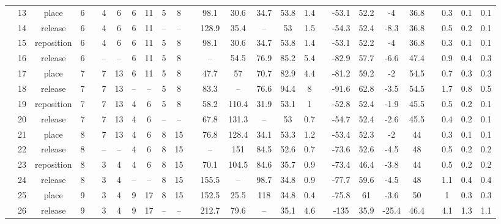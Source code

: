 \begin{landscape}
\begin{scriptsize}
\begin{longtable}{c cccr ccccccr cccccr ccccr ccc}
			&	13&place&6	&&	\cellcolor{babyblue}4&\cellcolor{babyblue}6	&	6&11	&	5&8	&&	98.1&30.6&34.7&53.8&1.4	&&	-53.1&52.2&-4&36.8	&&	0.3&0.1&0.1	\\
			&	14&release&6	&&	\cellcolor{babyblue}4&\cellcolor{babyblue}6	&	6&11	&	--&--	&&	128.9&35.4&--&53&1.5	&&	-54.3&52.4&-8.3&36.8	&&	0.5&0.2&0.1	\\
			&	15&reposition&6	&&	\cellcolor{babyblue}4&\cellcolor{babyblue}6	&	6&11	&	\cellcolor{babyblue}5&\cellcolor{babyblue}8	&&	98.1&30.6&34.7&53.8&1.4	&&	-53.1&52.2&-4&36.8	&&	0.3&0.1&0.1	\\
			&	16&release&6	&&	--&--	&	6&11	&	\cellcolor{babyblue}5&\cellcolor{babyblue}8	&&	--&54.5&76.9&85.2&5.4	&&	-82.9&57.7&-6.6&47.4	&&	0.9&0.4&0.3	\\
			&	17&place&7	&&	7&13	&	6&11	&	\cellcolor{babyblue}5&\cellcolor{babyblue}8	&&	47.7&57&70.7&82.9&4.4	&&	-81.2&59.2&-2&54.5	&&	0.7&0.3&0.3	\\
			&	18&release&7	&&	7&13	&	--&--	&	\cellcolor{babyblue}5&\cellcolor{babyblue}8	&&	83.3&--&76.6&94.4&8	&&	-91.6&62.8&-3.5&54.5	&&	1.7&0.8&0.5	\\
			&	19&reposition&7	&&	7&13	&	\cellcolor{babyblue}4&\cellcolor{babyblue}6	&	\cellcolor{babyblue}5&\cellcolor{babyblue}8	&&	58.2&110.4&31.9&53.1&1	&&	-52.8&52.4&-1.9&45.5	&&	0.5&0.2&0.1	\\
			&	20&release&7	&&	7&13	&	\cellcolor{babyblue}4&\cellcolor{babyblue}6	&	--&--	&&	67.8&131.3&--&53&0.7	&&	-54.7&52.4&-2.6&45.5	&&	0.4&0.2&0.1	\\
			&	21&place&8	&&	7&13	&	\cellcolor{babyblue}4&\cellcolor{babyblue}6	&	8&15	&&	76.8&128.4&34.1&53.3&1.2	&&	-53.4&52.3&-2&44	&&	0.3&0.1&0.1	\\
			&	22&release&8	&&	--&--	&	\cellcolor{babyblue}4&\cellcolor{babyblue}6	&	8&15	&&	--&151&84.5&52.6&0.7	&&	-73.6&52.6&-4.5&48	&&	0.5&0.2&0.2	\\
			&	23&reposition&8	&&	\cellcolor{babyblue}3&\cellcolor{babyblue}4	&	\cellcolor{babyblue}4&\cellcolor{babyblue}6	&	8&15	&&	70.1&104.5&84.6&35.7&0.9	&&	-73.4&46.4&-3.8&44	&&	0.5&0.2&0.2	\\
			&	24&release&8	&&	\cellcolor{babyblue}3&\cellcolor{babyblue}4	&	--&--	&	8&15	&&	155.5&--&98.7&34.8&0.9	&&	-77.7&59.6&-4.5&48	&&	1.1&0.4&0.4	\\
			&	25&place&9	&&	\cellcolor{babyblue}3&\cellcolor{babyblue}4	&	9&17	&	8&15	&&	152.5&25.5&118&34.8&0.4	&&	-75.8&61&-3.6&50	&&	1&0.3&0.3	\\
			&	26&release&9	&&	\cellcolor{babyblue}3&\cellcolor{babyblue}4	&	9&17	&	--&--	&&	212.7&79.6&--&35.1&4.6	&&	-135&35.9&-25.4&46.4	&&	4.1&1.3&1.1	\\

\end{longtable}
\end{scriptsize}
\end{landscape}
